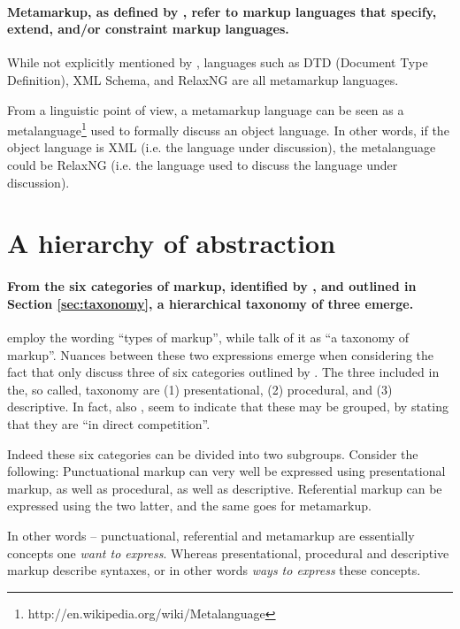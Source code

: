 \documentclass{scrreprt}
\begin{document}
\paragraph{Metamarkup, as defined by \citet{coombs}, refer to markup languages that specify, extend, and/or constraint markup languages.} While not explicitly mentioned by \citet{coombs}, languages such as DTD (Document Type Definition), XML Schema, and RelaxNG are all metamarkup languages.


From a linguistic point of view, a metamarkup language can be seen as a metalanguage\footnote{http://en.wikipedia.org/wiki/Metalanguage} used to formally discuss an object language. In other words, if the object language is XML (i.e. the language under discussion), the metalanguage could be RelaxNG (i.e. the language used to discuss the language under discussion).




\section{A hierarchy of abstraction}
\label{sec:abstraction-hierarchy}
\paragraph{From the six categories of markup, identified by \citet{coombs}, and outlined in Section \ref{sec:taxonomy}, a hierarchical taxonomy of three emerge.} \citet{coombs} employ the wording ``types of markup'', while \citet{bray} talk of it as ``a taxonomy of markup''. Nuances between these two expressions emerge when considering the fact that \citet{bray} only discuss three of six categories outlined by \citet{coombs}. The three included in the, so called, taxonomy are (1) presentational, (2) procedural, and (3) descriptive. In fact, also \citet{coombs}, seem to indicate that these may be grouped, by stating that they are ``in direct competition''.

Indeed these six categories can be divided into two subgroups. Consider the following: Punctuational markup can very well be expressed using presentational markup, as well as procedural, as well as descriptive. Referential markup can be expressed using the two latter, and the same goes for metamarkup.

In other words -- punctuational, referential and metamarkup are essentially concepts one \emph{want to express}. Whereas presentational, procedural and descriptive markup describe syntaxes, or in other words \emph{ways to express} these concepts. 
\end{document}
